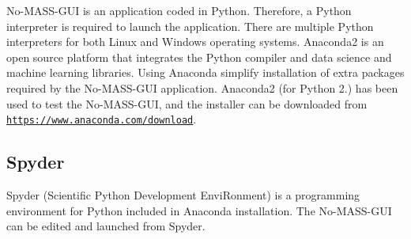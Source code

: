 

No-\/\+M\+A\+S\+S-\/\+G\+UI is an application coded in Python. Therefore, a Python interpreter is required to launch the application. There are multiple Python interpreters for both Linux and Windows operating systems. Anaconda2 is an open source platform that integrates the Python compiler and data science and machine learning libraries. Using Anaconda simplify installation of extra packages required by the No-\/\+M\+A\+S\+S-\/\+G\+UI application. Anaconda2 (for Python 2.) has been used to test the No-\/\+M\+A\+S\+S-\/\+G\+UI, and the installer can be downloaded from \href{https://www.anaconda.com/download/}{\tt https\+://www.\+anaconda.\+com/download}.

 

\subsection*{Spyder}

 Spyder (Scientific Python Development Envi\+Ronment) is a programming environment for Python included in Anaconda installation. The No-\/\+M\+A\+S\+S-\/\+G\+UI can be edited and launched from Spyder. 